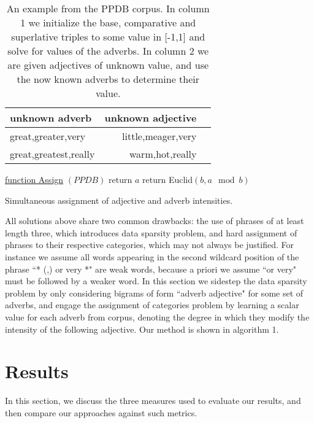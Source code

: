 \begin{table}
\small
\centering
\begin{tabular}{|l|rl|}
\hline \bf unknown adverb & \bf unknown adjective & \\ \hline
great,greater,very     & little,meager,very  & \\
great,greatest,really  & warm,hot,really     & \\
\hline
\end{tabular}
\caption{\label{font-table} An example from the PPDB corpus. In column 1 we initialize the base, comparative and superlative triples to some value in [-1,1] and solve for values of the adverbs. In column 2 we are given adjectives of unknown value, and use the now known adverbs to determine their value.}
\end{table}

\begin{algorithm}

    \underline{function Assign} $(PPDB)$\;
      {
        return $a$\;
      }
      {
        return Euclid$(b,a\mod b)$\;
      }
    \caption{Simultaneous assignment of adjective and adverb intensities.}
\end{algorithm}


All solutions above share two common drawbacks: the use of phrases of at least length three, which introduces data sparsity problem, and hard assignment of phrases to their respective categories, which may not always be justified. For instance we assume all words appearing in the second wildcard position of the phrase ``* (,) or very *"  are weak words, because a priori we assume ``or very" must be followed by a weaker word. In this section we sidestep the data sparsity problem by only considering bigrams of form ``adverb adjective" for some set of adverbs, and engage the assignment of categories problem by learning a scalar value for each adverb from corpus, denoting the degree in which they modify the intensity of the following adjective. Our method is shown in algorithm 1. 


\section{Results}

In this section, we discuss the three measures used to evaluate our results, and then compare our approaches against such metrics. 

